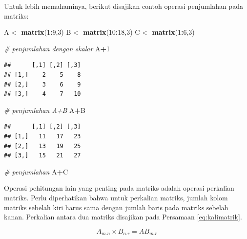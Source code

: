 \documentclass[
]{book}
\newenvironment{Shaded}{\begin{snugshade}}{\end{snugshade}}
\newcommand{\CommentTok}[1]{\textcolor[rgb]{0.56,0.35,0.01}{\textit{#1}}}
\newcommand{\DecValTok}[1]{\textcolor[rgb]{0.00,0.00,0.81}{#1}}
\newcommand{\FunctionTok}[1]{\textcolor[rgb]{0.13,0.29,0.53}{\textbf{#1}}}
\newcommand{\NormalTok}[1]{#1}
\newcommand{\OtherTok}[1]{\textcolor[rgb]{0.56,0.35,0.01}{#1}}
\newcommand{\SpecialCharTok}[1]{\textcolor[rgb]{0.81,0.36,0.00}{\textbf{#1}}}
\theoremstyle{definition}
\theoremstyle{definition}
\theoremstyle{definition}
\theoremstyle{definition}
\theoremstyle{remark}
\begin{document}
Untuk lebih memahaminya, berikut disajikan contoh operasi penjumlahan pada matriks:

\begin{Shaded}
\begin{Highlighting}[]
\NormalTok{A }\OtherTok{\textless{}{-}} \FunctionTok{matrix}\NormalTok{(}\DecValTok{1}\SpecialCharTok{:}\DecValTok{9}\NormalTok{,}\DecValTok{3}\NormalTok{)}
\NormalTok{B }\OtherTok{\textless{}{-}} \FunctionTok{matrix}\NormalTok{(}\DecValTok{10}\SpecialCharTok{:}\DecValTok{18}\NormalTok{,}\DecValTok{3}\NormalTok{)}
\NormalTok{C }\OtherTok{\textless{}{-}} \FunctionTok{matrix}\NormalTok{(}\DecValTok{1}\SpecialCharTok{:}\DecValTok{6}\NormalTok{,}\DecValTok{3}\NormalTok{)}

\CommentTok{\# penjumlahan dengan skalar}
\NormalTok{A}\SpecialCharTok{+}\DecValTok{1}
\end{Highlighting}
\end{Shaded}

\begin{verbatim}
##      [,1] [,2] [,3]
## [1,]    2    5    8
## [2,]    3    6    9
## [3,]    4    7   10
\end{verbatim}

\begin{Shaded}
\begin{Highlighting}[]
\CommentTok{\# penjumlahan A+B}
\NormalTok{A}\SpecialCharTok{+}\NormalTok{B}
\end{Highlighting}
\end{Shaded}

\begin{verbatim}
##      [,1] [,2] [,3]
## [1,]   11   17   23
## [2,]   13   19   25
## [3,]   15   21   27
\end{verbatim}

\begin{Shaded}
\begin{Highlighting}[]
\CommentTok{\# penjumlahan}
\NormalTok{A}\SpecialCharTok{+}\NormalTok{C}
\end{Highlighting}
\end{Shaded}

Operasi pehitungan lain yang penting pada matriks adalah operasi perkalian matriks. Perlu diperhatikan bahwa untuk perkalian matriks, jumlah kolom matriks sebelah kiri harus sama dengan jumlah baris pada matriks sebelah kanan. Perkalian antara dua matriks disajikan pada Persamaan \eqref{eq:kalimatrik}.

\begin{equation}
A_{m.n}\times B_{n.r}=AB_{m.r}
  \label{eq:kalimatrik}
\end{equation}
\end{document}
